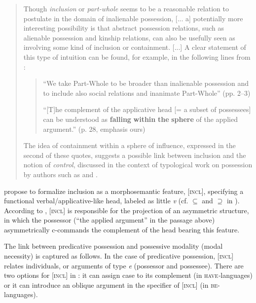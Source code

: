 \documentclass[output=paper,colorlinks,citecolor=brown,modfonts,nonflat]{langsci/langscibook}
\begin{document}
\begin{quote}
Though \textit{inclusion} or \textit{part-whole} seems to be a reasonable relation to postulate in the domain of inalienable possession, [... a] potentially more interesting possibility is that abstract possession relations, such as alienable possession and kinship relations, can also be usefully seen as involving some kind of inclusion or containment. [...] A clear statement of this type of intuition can be found, for example, in the following lines from \citet{BonehSichel2010}:

\begin{quote}
“We take Part-Whole to be broader than inalienable possession and to include also social relations and inanimate Part-Whole” (pp. 2–3)

“[T]he complement of the applicative head [= a subset of possessees] can be understood as \textbf{falling} \textbf{within} \textbf{the} \textbf{sphere} of the applied argument.” (p. 28, emphasis ours)
\end{quote}

The idea of containment within a sphere of influence, expressed in the second of these quotes, suggests a possible link between inclusion and the notion of \textit{control}, discussed in the context of typological work on possession by authors such as \citet{Heine1997} and \citet{Stassen2009}. \citep[33--34]{BjorkmanCowper2016}
\end{quote}

\citeauthor{BjorkmanCowper2016} propose to formalize inclusion as a morphosemantic feature, [\textsc{incl}], specifying a functional verbal/applicative-like head, labeled as little \textit{v}  (cf. ${\subseteq}$ and ${\supseteq}$ in ). According to \citeauthor{BjorkmanCowper2016}, [\textsc{incl}] is responsible for the projection of an asymmetric structure, in which the possessor (“the applied argument” in the passage above) asymmetrically c-commands the complement of the head bearing this feature.

The link between predicative possession and possessive modality (modal necessity) is captured as follows. In the case of predicative possession, [\textsc{incl]} relates individuals, or arguments of type \textit{e} (possessor and possessee). There are two options for {\liv}[\textsc{incl}] in : it can assign case to its complement (in \textsc{have}\textit{{}-}languages) or it can introduce an oblique argument in the specifier of {\liv}[\textsc{incl}] (in \textsc{be}{}-languages).
\end{document}
